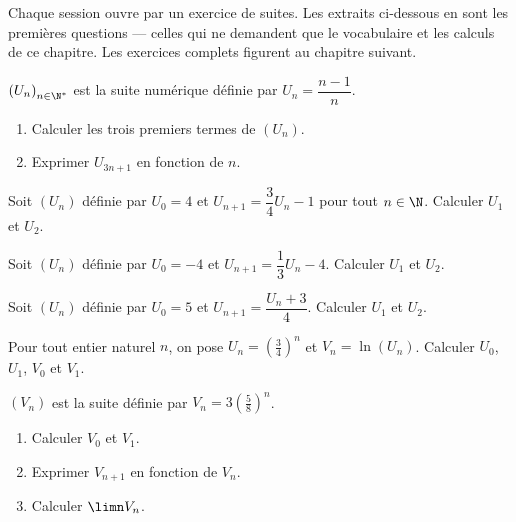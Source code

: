 \begin{annales}
Chaque session ouvre par un exercice de suites. Les extraits ci-dessous en
sont les premières questions — celles qui ne demandent que le vocabulaire et
les calculs de ce chapitre. Les exercices complets figurent au chapitre
suivant.

$\left(U_{n}\right)_{n \in \N^{*}}$ est la suite numérique définie par
$U_{n} = \dfrac{n-1}{n}$.
\begin{enumerate}[label=\textbf{\alph*)}, leftmargin=*, itemsep=0.15em]
  \item Calculer les trois premiers termes de $\left(U_{n}\right)$.
  \item Exprimer $U_{3n+1}$ en fonction de $n$.
\end{enumerate}

Soit $\left(U_{n}\right)$ définie par $U_{0} = 4$ et
$U_{n+1} = \dfrac34 U_{n}-1$ pour tout $n \in \N$. Calculer $U_{1}$ et
$U_{2}$.

Soit $\left(U_{n}\right)$ définie par $U_{0} = -4$ et
$U_{n+1} = \dfrac13 U_{n}-4$. Calculer $U_{1}$ et $U_{2}$.

Soit $\left(U_{n}\right)$ définie par $U_{0} = 5$ et
$U_{n+1} = \dfrac{U_{n}+3}{4}$. Calculer $U_{1}$ et $U_{2}$.

Pour tout entier naturel $n$, on pose $U_{n} = \left(\frac34\right)^{n}$ et
$V_{n} = \ln\left(U_{n}\right)$. Calculer $U_{0}$, $U_{1}$, $V_{0}$ et
$V_{1}$.

$\left(V_{n}\right)$ est la suite définie par
$V_{n} = 3\left(\frac58\right)^{n}$.
\begin{enumerate}[label=\textbf{\alph*)}, leftmargin=*, itemsep=0.15em]
  \item Calculer $V_{0}$ et $V_{1}$.
  \item Exprimer $V_{n+1}$ en fonction de $V_{n}$.
  \item Calculer $\limn V_{n}$.
\end{enumerate}
\end{annales}

